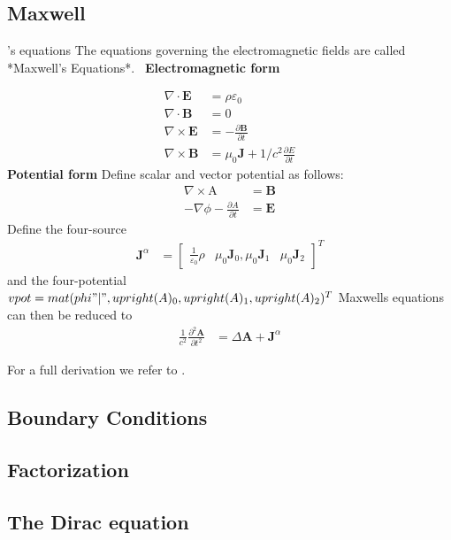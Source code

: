 \documentclass[10pt]{report}
\begin{document}
\subsection{Maxwell} 's equations
The equations governing the electromagnetic fields are called *Maxwell's Equations*. \
\textbf{Electromagnetic form} 

\begin{align} 
\nabla \cdot  \mathbf{E} &= \rho\varepsilon_0 \\
\nabla \cdot  \mathbf{B} &= 0 \\
\nabla \times \mathbf{E} &= -\frac{\partial \mathbf{B}}{\partial t} \\
\nabla \times \mathbf{B} &= \mu_0 \mathbf{J} + 1 / c^2 \frac{\partial E}{\partial t}
\end{align} \label{em_maxwell}
\textbf{Potential form} 
Define scalar and vector potential as follows:
\begin{align*}
 \nabla \times \mathrm{A} &= \mathbf{B} \\
 -\nabla \phi - \frac{\partial A}{\partial t} &= \mathbf{E}
\end{align*}
Define the four-source
\begin{align*}
 \mathbf{J}^\alpha &= \begin{bmatrix}\frac{1}{\varepsilon_0} \rho & \mu_0 \mathbf{J}_0, \mu_0  \mathbf{J}_1 & \mu_0 
 \mathbf{J}_2 \end{bmatrix}^T 
\end{align*}
and the four-potential
$ vpot = mat(phi "|", upright(A)_0, upright(A)_1, upright(A)_2)^T $
Maxwells equations can then be reduced to
\begin{align}
 \frac{1}{c^2} \frac{\partial^2 \mathbf{A}}{\partial t^2} &= \Delta \mathbf{A} + \mathbf{J}^\alpha 
\end{align} \label{potential_maxwell}

For a full derivation we refer to \cite{3A_Maxwell}.

\subsection{Boundary Conditions } \label{bconds_section}
\subsection{Factorization}
\subsection{The Dirac equation}
\end{document}
